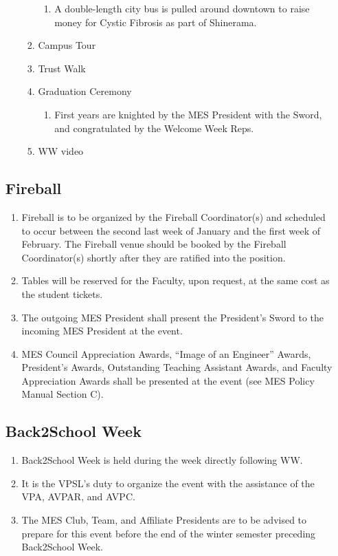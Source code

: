 \begin{enumerate}
\begin{enumerate}
\begin{enumerate}
    \begin{enumerate}
     \item
      A double-length city bus is pulled around downtown to raise money
      for Cystic Fibrosis as part of Shinerama.
    \end{enumerate}
   \item
    Campus Tour
   \item
    Trust Walk
   \item
    Graduation Ceremony

    \begin{enumerate}
     \item
      First years are knighted by the MES President with the Sword, and
      congratulated by the Welcome Week Reps.
    \end{enumerate}
   \item
    WW video
  \end{enumerate}
\end{enumerate}

\hypertarget{fireball}{%
 \subsection{Fireball}
 \label{fireball}}
\begin{enumerate}
 \item
  Fireball is to be organized by the Fireball Coordinator(s) and
  scheduled to occur between the second last week of January and the
  first week of February. The Fireball venue should be booked by the
  Fireball Coordinator(s) shortly after they are ratified into the
  position.
 \item
  Tables will be reserved for the Faculty, upon request, at the same
  cost as the student tickets.
 \item
  The outgoing MES President shall present the President's Sword to the
  incoming MES President at the event.
 \item
  MES Council Appreciation Awards, ``Image of an Engineer'' Awards,
  President's Awards, Outstanding Teaching Assistant Awards, and Faculty
  Appreciation Awards shall be presented at the event (see MES Policy
  Manual Section C).

\end{enumerate}

\hypertarget{back2school-week}{%
 \subsection{Back2School Week}
 \label{back2school-week}}
\begin{enumerate}
 \item
  Back2School Week is held during the week directly following WW.
 \item
  It is the VPSL's duty to organize the event with the assistance of the
  VPA, AVPAR, and AVPC.
 \item
  The MES Club, Team, and Affiliate Presidents are to be advised to
  prepare for this event before the end of the winter semester preceding
  Back2School Week.


\end{enumerate}
\end{enumerate}
